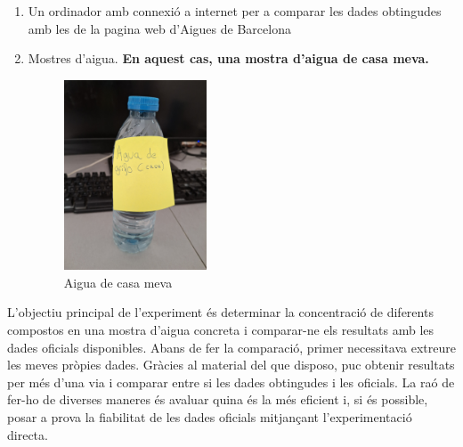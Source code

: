 \begin{enumerate}
 \item Un ordinador amb connexió a internet per a comparar les dades obtingudes amb les de la pagina web d'Aigues de Barcelona \cite{qualitatAigua}

 \item Mostres d'aigua. \textbf{En aquest cas, una mostra d'aigua de casa meva.}
 \begin{figure}[h!]
    \centering
    \includegraphics[width=0.4\textwidth, angle=270]{./Figures/aguadecasa.png}
    \caption{Aigua de casa meva}
    \label{fig:fotoAiguaCasaMeva}
  \end{figure}
\end{enumerate}


L’objectiu principal de l'experiment és determinar la concentració de diferents compostos en una mostra d’aigua concreta i comparar-ne els resultats amb les dades oficials disponibles. Abans de fer la comparació, primer necessitava extreure les meves pròpies dades. Gràcies al material del que disposo, puc obtenir resultats per més d’una via i comparar entre si les dades obtingudes i les oficials. La raó de fer-ho de diverses maneres és avaluar quina és la més eficient i, si és possible, posar a prova la fiabilitat de les dades oficials mitjançant l’experimentació directa.

